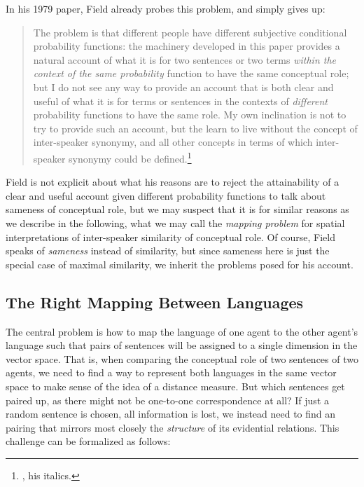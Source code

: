 \documentclass[11pt, a4paper]{scrartcl}
\renewcommand{\i}[1]{\emph{#1}}
\begin{document}
In his 1979 paper, Field already probes this problem, and simply gives up:
\begin{quote}\singlespacing{}
  The problem is that different people have different subjective
 conditional probability functions: the machinery developed in this
 paper provides a natural account of what it is for two sentences or
 two terms \i{within the context of the same probability} function to have
 the same conceptual role; but I do not see any way to provide an
 account that is both clear and useful of what it is for terms or sentences in the contexts of \i{different} probability functions to have the
 same role. My own inclination is not to try to provide such an
 account, but the learn to live without the concept of inter-speaker
 synonymy, and all other concepts in terms of which inter-speaker
 synonymy could be defined.\footnote{\textcite[398]{Field1977}, his italics.} 
 \end{quote}

 Field is not explicit about what his reasons are to reject the attainability of a clear and useful account given different probability functions to talk about sameness of conceptual role, but we may suspect that it is for similar reasons as we describe in the following, what we may call the \i{mapping problem} for spatial interpretations of inter-speaker similarity of conceptual role. Of course, Field speaks of \i{sameness} instead of similarity, but since sameness here is just the special case of maximal similarity, we inherit the problems posed for his account.  

\subsection{The Right Mapping Between Languages}

The central problem is how to map the language of one agent to the other agent's language such that pairs of sentences will be assigned to a single dimension in the vector space. That is, when comparing the conceptual role of two sentences of two agents, we need to find a way to represent both languages in the same vector space to make sense of the idea of a distance measure. But which sentences get paired up, as there might not be one-to-one correspondence at all? If just a random sentence is chosen, all information is lost, we instead need to find an pairing that mirrors most closely the \i{structure} of its evidential relations. This challenge can be formalized as follows:
\end{document}

